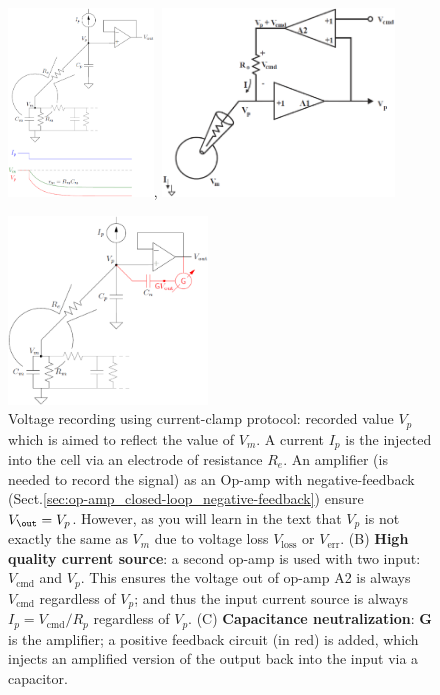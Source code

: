 \begin{figure}[hbt]
  \centerline{\includegraphics[height=5cm,
    angle=0]{./images/current-clamp.eps},
    \includegraphics[height=5cm,
    angle=0]{./images/current-clamp-current-source.eps}
    }
\centerline{\includegraphics[height=5cm,
    angle=0]{./images/current-clamp-capacitance-neutralization.eps}}
  \caption{Voltage recording using current-clamp protocol: recorded value $V_p$
  which is aimed to reflect the value of $V_m$. A current $I_p$
  is the injected into the cell via an electrode of resistance $R_e$.
  An amplifier (is needed to record the signal) as an Op-amp with
  negative-feedback (Sect.\ref{sec:op-amp_closed-loop_negative-feedback}) ensure
  $V_\out=V_p$. However, as you will learn in the text that $V_p$ is not
  exactly the same as $V_m$ due to voltage loss $V_\text{loss}$ or
  $V_\text{err}$. (B) {\bf High quality current source}: a second op-amp is used
  with two input: $V_\text{cmd}$ and $V_p$. This ensures the voltage out of
  op-amp A2 is always $V_\text{cmd}$ regardless of $V_p$; and thus the input
  current source is always $I_p = V_\text{cmd}/R_p$ regardless of $V_p$.
  (C) {\bf Capacitance neutralization}: {\bf G} is the amplifier; a positive
  feedback circuit (in red) is added, which injects an amplified version of the
  output back into the input via a capacitor.}
  \label{fig:current-clamp}
\end{figure}

